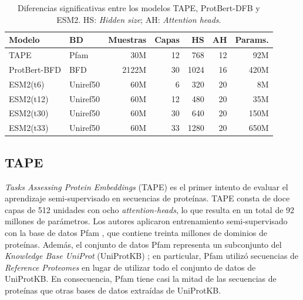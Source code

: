 \begin{table}[H]%
	\centering
	\caption{Diferencias significativas entre los modelos TAPE, ProtBert-DFB y ESM2. HS: \textit{Hidden size}; AH: \textit{Attention heads}.}
	\label{tab:pretrained}%
	\setlength{\tabcolsep}{0.5em} %
	{\renewcommand{\arraystretch}{1.5}%
	\begin{tabular}{llrrrrr}
		
		\textbf{Modelo}   & \textbf{BD} & \textbf{Muestras} & \textbf{Capas} & \textbf{HS} & \textbf{AH} & \textbf{Params.} \\
		\midrule
		TAPE             & Pfam             & 30M                   & 12              & 768                  & 12                       & 92M                 \\
		ProtBert-BFD     & BFD              & 2122M                 & 30              & 1024                 & 16                       & 420M                \\
		ESM2(t6)  & Uniref50         & 60M                   & 6               & 320                  & 20                       & 8M                  \\
		ESM2(t12)  & Uniref50         & 60M                   & 12              & 480                  & 20                       & 35M                 \\
		ESM2(t30) & Uniref50         & 60M                   & 30              & 640                  & 20                       & 150M                \\
		ESM2(t33)  & Uniref50         & 60M                   & 33              & 1280                 & 20                       & 650M               \\
		
	\end{tabular}}
	
\end{table}

\subsection{TAPE}


\textit{Tasks Assessing Protein Embeddings} (TAPE) \citep{rao2019evaluating} es el primer intento de evaluar el aprendizaje semi-supervisado en secuencias de proteínas. TAPE consta de doce capas de 512 unidades con ocho \textit{attention-heads}, lo que resulta en un total de 92 millones de parámetros. Los autores aplicaron entrenamiento semi-supervisado con la base de datos Pfam \citep{el2019pfam}, que contiene treinta millones de dominios de proteínas. Además, el conjunto de datos Pfam representa un subconjunto del \textit{Knowledge Base UniProt} (UniProtKB) \citep{uniprot2018uniprot}; en particular, Pfam utilizó secuencias de \textit{Reference Proteomes} \citep{finn2016pfam} en lugar de utilizar todo el conjunto de datos de UniProtKB. En consecuencia, Pfam tiene casi la mitad de las secuencias de proteínas que otras bases de datos extraídas de UniProtKB.

